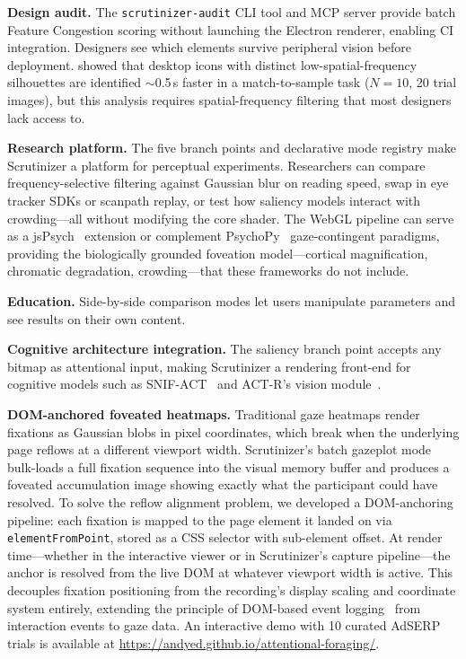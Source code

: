 \documentclass[10pt,twocolumn,letterpaper]{article}
\makeatletter
\renewcommand\section{\@startsection{section}{1}{\z@}{5pt}{2pt}{\normalfont\bfseries\normalsize}}
\makeatother
\begin{document}
\section{Applications}

\textbf{Design audit.} The \texttt{scrutinizer-audit} CLI tool and MCP server provide batch Feature Congestion scoring without launching the Electron renderer, enabling CI integration. Designers see which elements survive peripheral vision before deployment. \citet{queen2006} showed that desktop icons with distinct low-spatial-frequency silhouettes are identified ${\sim}$0.5\,s faster in a match-to-sample task ($N{=}10$, 20 trial images), but this analysis requires spatial-frequency filtering that most designers lack access to.

\textbf{Research platform.} The five branch points and declarative mode registry make Scrutinizer a platform for perceptual experiments. Researchers can compare frequency-selective filtering against Gaussian blur on reading speed, swap in eye tracker SDKs or scanpath replay, or test how saliency models interact with crowding---all without modifying the core shader. The WebGL pipeline can serve as a jsPsych~\citep{deleeuw2015} extension or complement PsychoPy~\citep{peirce2019} gaze-contingent paradigms, providing the biologically grounded foveation model---cortical magnification, chromatic degradation, crowding---that these frameworks do not include.

\textbf{Education.} Side-by-side comparison modes let users manipulate parameters and see results on their own content.

\textbf{Cognitive architecture integration.} The saliency branch point accepts any bitmap as attentional input, making Scrutinizer a rendering front-end for cognitive models such as SNIF-ACT~\citep{fu2007} and ACT-R's vision module~\citep{salvucci2001}.

\textbf{DOM-anchored foveated heatmaps.} Traditional gaze heatmaps render fixations as Gaussian blobs in pixel coordinates, which break when the underlying page reflows at a different viewport width. Scrutinizer's batch gazeplot mode bulk-loads a full fixation sequence into the visual memory buffer and produces a foveated accumulation image showing exactly what the participant could have resolved. To solve the reflow alignment problem, we developed a DOM-anchoring pipeline: each fixation is mapped to the page element it landed on via \texttt{elementFromPoint}, stored as a CSS selector with sub-element offset. At render time---whether in the interactive viewer or in Scrutinizer's capture pipeline---the anchor is resolved from the live DOM at whatever viewport width is active. This decouples fixation positioning from the recording's display scaling and coordinate system entirely, extending the principle of DOM-based event logging~\citep{edmonds2003,edmonds2007} from interaction events to gaze data. An interactive demo with 10 curated AdSERP trials is available at \url{https://andyed.github.io/attentional-foraging/}.
\end{document}

